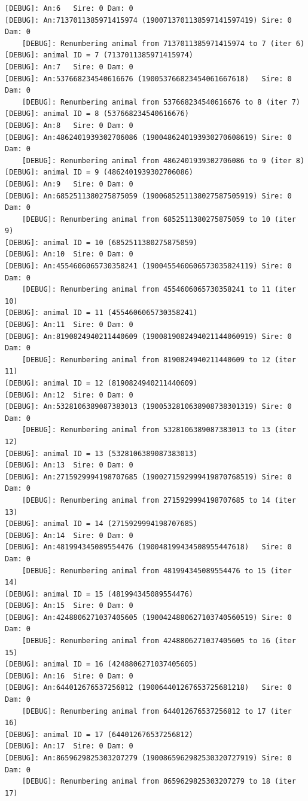 \documentclass[
  letterpaper,
  DIV=11,
  numbers=noendperiod]{scrreprt}
\begin{document}
\begin{codelisting}
{\begin{verbatim}
[DEBUG]: An:6   Sire: 0 Dam: 0
[DEBUG]: An:7137011385971415974 (1900713701138597141597419) Sire: 0 Dam: 0
    [DEBUG]: Renumbering animal from 7137011385971415974 to 7 (iter 6)
[DEBUG]: animal ID = 7 (7137011385971415974)
[DEBUG]: An:7   Sire: 0 Dam: 0
[DEBUG]: An:537668234540616676 (190053766823454061667618)   Sire: 0 Dam: 0
    [DEBUG]: Renumbering animal from 537668234540616676 to 8 (iter 7)
[DEBUG]: animal ID = 8 (537668234540616676)
[DEBUG]: An:8   Sire: 0 Dam: 0
[DEBUG]: An:4862401939302706086 (1900486240193930270608619) Sire: 0 Dam: 0
    [DEBUG]: Renumbering animal from 4862401939302706086 to 9 (iter 8)
[DEBUG]: animal ID = 9 (4862401939302706086)
[DEBUG]: An:9   Sire: 0 Dam: 0
[DEBUG]: An:6852511380275875059 (1900685251138027587505919) Sire: 0 Dam: 0
    [DEBUG]: Renumbering animal from 6852511380275875059 to 10 (iter 9)
[DEBUG]: animal ID = 10 (6852511380275875059)
[DEBUG]: An:10  Sire: 0 Dam: 0
[DEBUG]: An:4554606065730358241 (1900455460606573035824119) Sire: 0 Dam: 0
    [DEBUG]: Renumbering animal from 4554606065730358241 to 11 (iter 10)
[DEBUG]: animal ID = 11 (4554606065730358241)
[DEBUG]: An:11  Sire: 0 Dam: 0
[DEBUG]: An:8190824940211440609 (1900819082494021144060919) Sire: 0 Dam: 0
    [DEBUG]: Renumbering animal from 8190824940211440609 to 12 (iter 11)
[DEBUG]: animal ID = 12 (8190824940211440609)
[DEBUG]: An:12  Sire: 0 Dam: 0
[DEBUG]: An:5328106389087383013 (1900532810638908738301319) Sire: 0 Dam: 0
    [DEBUG]: Renumbering animal from 5328106389087383013 to 13 (iter 12)
[DEBUG]: animal ID = 13 (5328106389087383013)
[DEBUG]: An:13  Sire: 0 Dam: 0
[DEBUG]: An:2715929994198707685 (1900271592999419870768519) Sire: 0 Dam: 0
    [DEBUG]: Renumbering animal from 2715929994198707685 to 14 (iter 13)
[DEBUG]: animal ID = 14 (2715929994198707685)
[DEBUG]: An:14  Sire: 0 Dam: 0
[DEBUG]: An:481994345089554476 (190048199434508955447618)   Sire: 0 Dam: 0
    [DEBUG]: Renumbering animal from 481994345089554476 to 15 (iter 14)
[DEBUG]: animal ID = 15 (481994345089554476)
[DEBUG]: An:15  Sire: 0 Dam: 0
[DEBUG]: An:4248806271037405605 (1900424880627103740560519) Sire: 0 Dam: 0
    [DEBUG]: Renumbering animal from 4248806271037405605 to 16 (iter 15)
[DEBUG]: animal ID = 16 (4248806271037405605)
[DEBUG]: An:16  Sire: 0 Dam: 0
[DEBUG]: An:644012676537256812 (190064401267653725681218)   Sire: 0 Dam: 0
    [DEBUG]: Renumbering animal from 644012676537256812 to 17 (iter 16)
[DEBUG]: animal ID = 17 (644012676537256812)
[DEBUG]: An:17  Sire: 0 Dam: 0
[DEBUG]: An:8659629825303207279 (1900865962982530320727919) Sire: 0 Dam: 0
    [DEBUG]: Renumbering animal from 8659629825303207279 to 18 (iter 17)

\end{verbatim}}
\end{codelisting}
\end{document}
